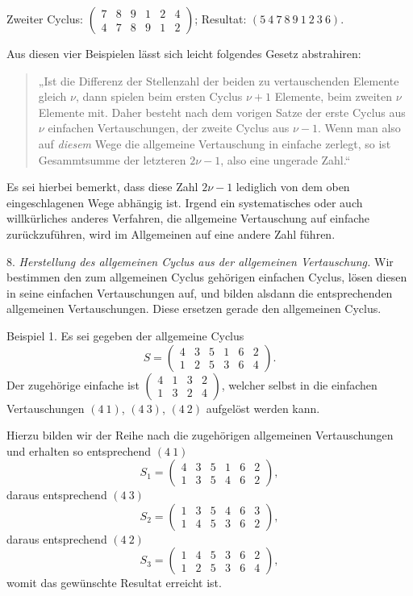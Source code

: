 \documentclass[10pt]{article}
\begin{document}
Zweiter Cyclus: \(\begin{pmatrix}7&8&9&1&2&4\\4&7&8&9&1&2\end{pmatrix}\); Resultat: \((5\ 4\ 7\ 8\ 9\ 1\ 2\ 3\ 6)\).

Aus diesen vier Beispielen lässt sich leicht folgendes Gesetz abstrahiren:
\begin{quote}
„Ist die Differenz der Stellenzahl der beiden zu vertauschenden Elemente gleich \(\nu\), dann spielen beim ersten Cyclus \(\nu+1\) Elemente, beim zweiten \(\nu\) Elemente mit. Daher besteht nach dem vorigen Satze der erste Cyclus aus \(\nu\) einfachen Vertauschungen, der zweite Cyclus aus \(\nu-1\). Wenn man also auf \emph{diesem} Wege die allgemeine Vertauschung in einfache zerlegt, so ist Gesammtsumme der letzteren \(2\nu-1\), also eine ungerade Zahl.“
\end{quote}
Es sei hierbei bemerkt, dass diese Zahl \(2\nu-1\) lediglich von dem oben eingeschlagenen Wege abhängig ist. Irgend ein systematisches oder auch willkürliches anderes Verfahren, die allgemeine Vertauschung auf einfache zurückzuführen, wird im Allgemeinen auf eine andere Zahl führen.

8. \emph{Herstellung des allgemeinen Cyclus aus der allgemeinen Vertauschung.} Wir bestimmen den zum allgemeinen Cyclus gehörigen einfachen Cyclus, lösen diesen in seine einfachen Vertauschungen auf, und bilden alsdann die entsprechenden allgemeinen Vertauschungen. Diese ersetzen gerade den allgemeinen Cyclus.

Beispiel 1. Es sei gegeben der allgemeine Cyclus
\[
S=\begin{pmatrix}4&3&5&1&6&2\\1&2&5&3&6&4\end{pmatrix}.
\]
Der zugehörige einfache ist \(\begin{pmatrix}4&1&3&2\\1&3&2&4\end{pmatrix}\), welcher selbst in die einfachen Vertauschungen \((4\ 1)\), \((4\ 3)\), \((4\ 2)\) aufgelöst werden kann.

Hierzu bilden wir der Reihe nach die zugehörigen allgemeinen Vertauschungen und erhalten so entsprechend \((4\ 1)\)
\[
S_1=\begin{pmatrix}4&3&5&1&6&2\\1&3&5&4&6&2\end{pmatrix},
\]
daraus entsprechend \((4\ 3)\)
\[
S_2=\begin{pmatrix}1&3&5&4&6&3\\1&4&5&3&6&2\end{pmatrix},
\]
daraus entsprechend \((4\ 2)\)
\[
S_3=\begin{pmatrix}1&4&5&3&6&2\\1&2&5&3&6&4\end{pmatrix},
\]
womit das gewünschte Resultat erreicht ist.
\end{document}
